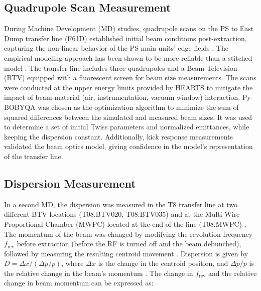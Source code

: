 \documentclass[a4paper,
               biblatex,     %
               ]{jacow}
\begin{document}
\subsection{Quadrupole Scan Measurement}

During Machine Development (MD) studies, quadrupole scans on the PS to East Dump transfer line (F61D) \cite{RadiationProtectionSurvey} established initial beam conditions post-extraction, capturing the non-linear behavior of the PS main units' edge fields \cite{angladaReferenceMagneticModel2019, manglunkiBeamOpticsModeling1997, zicklerInfluenceShimsPS}. The empirical modeling approach has been shown to be more reliable than a stitched model \cite{johnson:ipac22-mopotk030}. The transfer line includes three quadrupoles and a Beam Television (BTV) equipped with a fluorescent screen for beam size measurements. The scans were conducted at the upper energy limits provided by HEARTS to mitigate the impact of beam-material (air, instrumentation, vacuum window) interaction. Py-BOBYQA \cite{cartis_escaping_2022, cartis_improving_2019} was chosen as the optimization algorithm to minimize the sum of squared differences between the simulated and measured beam sizes. It was used to determine a set of initial Twiss parameters and normalized emittances, while keeping the dispersion constant. Additionally, kick response measurements validated the beam optics model, giving confidence in the model's representation of the transfer line.



\subsection{Dispersion Measurement}

In a second MD, the dispersion was measured in the T8 transfer line at two different BTV locations (T08.BTV020, T08.BTV035) and at the Multi-Wire Proportional Chamber (MWPC) located at the end of the line (T08.MWPC) \cite{carlsenChapterBeamlineMain2021}. The momentum of the beam was changed by modifying the revolution frequency $f_{\text{rev}}$ before extraction (before the RF is turned off and the beam debunched), followed by measuring the resulting centroid movement \cite{mintyBeamTechniquesBeam2003}. Dispersion is given by \( D = \Delta x / (\Delta p / p) \), where \( \Delta x \) is the change in the centroid position, and \( \Delta p / p \) is the relative change in the beam's momentum \cite{chaoHandbookAcceleratorPhysics2023}. The change in $f_{\text{rev}}$ and the relative change in beam momentum can be expressed as:
\end{document}

